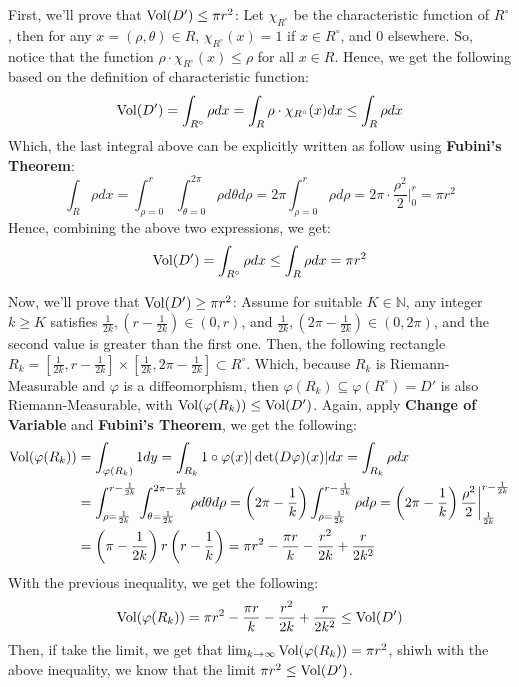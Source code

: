 \documentclass{article}
\begin{document}
First, we'll prove that $\textmd{Vol}(D')\leq \pi r^2$: Let $\chi_{R^\circ}$ be the characteristic function of $R^\circ$, then for any $x = (\rho,\theta)\in R$, $\chi_{R^\circ}(x)=1$ if $x\in R^\circ$, and $0$ elsewhere. So, notice that the function $\rho\cdot \chi_{R^\circ}(x) \leq \rho$ for all $x\in R$. Hence, we get the following based on the definition of characteristic function:
\begin{equation}
    \textmd{Vol}(D') = \int_{R^\circ}\rho dx = \int_{R}\rho\cdot \chi_{R^\circ}(x)dx \leq \int_{R}\rho dx
\end{equation}
Which, the last integral above can be explicitly written as follow using \textbf{Fubini's Theorem}:
\begin{equation}
    \int_{R}\rho dx = \int_{\rho =0}^{r}\int_{\theta=0}^{2\pi}\rho d\theta d\rho = 2\pi\int_{\rho=0}^{r}\rho d\rho = 2\pi\cdot \frac{\rho^2}{2}\bigg|_{0}^{r} = \pi r^2
\end{equation}
Hence, combining the above two expressions, we get:
\begin{equation}
    \textmd{Vol}(D') = \int_{R^\circ}\rho dx \leq \int_R\rho dx = \pi r^2
\end{equation}

Now, we'll prove that $\textmd{Vol}(D')\geq \pi r^2$: Assume for suitable $K\in\mathbb{N}$, any integer $k\geq K$ satisfies $\frac{1}{2k}, (r-\frac{1}{2k})\in (0,r)$, and $\frac{1}{2k},(2\pi -\frac{1}{2k})\in (0,2\pi)$, and the second value is greater than the first one. Then, the following rectangle $R_k = [\frac{1}{2k},r-\frac{1}{2k}]\times [\frac{1}{2k},2\pi -\frac{1}{2k}]\subset R^\circ$. Which, because $R_k$ is Riemann-Measurable and $\varphi$ is a diffeomorphism, then $\varphi(R_k)\subseteq \varphi(R^\circ)=D'$  is also Riemann-Measurable, with $\textmd{Vol}(\varphi(R_k))\leq \textmd{Vol}(D')$. Again, apply \textbf{Change of Variable} and \textbf{Fubini's Theorem}, we get the following:
\begin{equation}
    \begin{split}
        \textmd{Vol}(\varphi(R_k)) &= \int_{\varphi(R_k)}1 dy = \int_{R_k}1\circ \varphi(x)|\det(D\varphi)(x)|dx = \int_{R_k}\rho dx\\
        &= \int_{\rho=\frac{1}{2k}}^{r-\frac{1}{2k}}\int_{\theta = \frac{1}{2k}}^{2\pi -\frac{1}{2k}}\rho d\theta d\rho = \left(2\pi-\frac{1}{k}\right)\int_{\rho=\frac{1}{2k}}^{r-\frac{1}{2k}}\rho d\rho = \left(2\pi-\frac{1}{k}\right)\frac{\rho^2}{2}\bigg|_{\frac{1}{2k}}^{r-\frac{1}{2k}}\\
        &= \left(\pi-\frac{1}{2k}\right)r\left(r-\frac{1}{k}\right) = \pi r^2 - \frac{\pi r}{k} - \frac{r^2}{2k} + \frac{r}{2k^2}
    \end{split}
\end{equation}
With the previous inequality, we get the following:
\begin{equation}
    \textmd{Vol}(\varphi(R_k)) = \pi r^2 - \frac{\pi r}{k} - \frac{r^2}{2k} + \frac{r}{2k^2}\leq \textmd{Vol}(D')
\end{equation}
Then, if take the limit, we get that $\lim_{k\rightarrow\infty}\textmd{Vol}(\varphi(R_k)) = \pi r^2$, shiwh with the above inequality, we know that the limit $\pi r^2\leq \textmd{Vol}(D')$.
\end{document}
